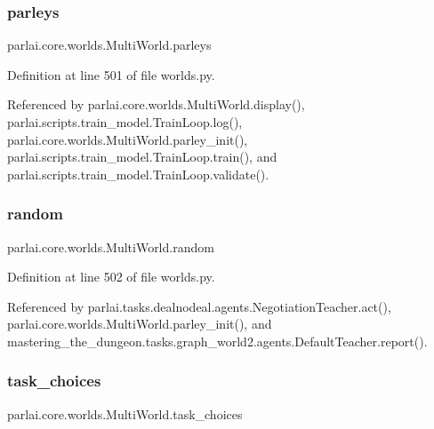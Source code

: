 \subsubsection{\texorpdfstring{parleys}{parleys}}
{\footnotesize\ttfamily parlai.\+core.\+worlds.\+Multi\+World.\+parleys}



Definition at line 501 of file worlds.\+py.



Referenced by parlai.\+core.\+worlds.\+Multi\+World.\+display(), parlai.\+scripts.\+train\+\_\+model.\+Train\+Loop.\+log(), parlai.\+core.\+worlds.\+Multi\+World.\+parley\+\_\+init(), parlai.\+scripts.\+train\+\_\+model.\+Train\+Loop.\+train(), and parlai.\+scripts.\+train\+\_\+model.\+Train\+Loop.\+validate().

\mbox{\label{classparlai_1_1core_1_1worlds_1_1MultiWorld_aa8e5d1fe78cd5ad37c142c95ff2a0a76}} 
\subsubsection{\texorpdfstring{random}{random}}
{\footnotesize\ttfamily parlai.\+core.\+worlds.\+Multi\+World.\+random}



Definition at line 502 of file worlds.\+py.



Referenced by parlai.\+tasks.\+dealnodeal.\+agents.\+Negotiation\+Teacher.\+act(), parlai.\+core.\+worlds.\+Multi\+World.\+parley\+\_\+init(), and mastering\+\_\+the\+\_\+dungeon.\+tasks.\+graph\+\_\+world2.\+agents.\+Default\+Teacher.\+report().

\mbox{\label{classparlai_1_1core_1_1worlds_1_1MultiWorld_af84190b29a206943d32a09e70301a5a2}} 
\subsubsection{\texorpdfstring{task\+\_\+choices}{task\_choices}}
{\footnotesize\ttfamily parlai.\+core.\+worlds.\+Multi\+World.\+task\+\_\+choices}



